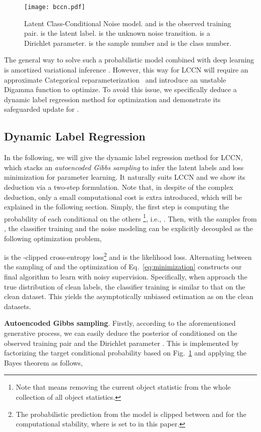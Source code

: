 \documentclass[journal]{IEEEtran}
\begin{document}
\begin{figure} 
\centering
\texttt{[image: bccn.pdf]}
\caption{Latent Class-Conditional Noise model.  and  is the observed training pair.  is the latent label.  is the unknown noise transition.  is a Dirichlet parameter.  is the sample number and  is the class number.}\label{fig:bccn}
\end{figure}
The general way to solve such a probabilistic model combined with deep learning is amortized variational inference \cite{kingma2013auto,MnihNVI}. However, this way for LCCN will require an approximate Categorical reparameterization~\cite{jang2017categorical,maddison2016concrete} and introduce an unstable Digamma function to optimize. To avoid this issue, we specifically deduce a dynamic label regression method for optimization and demonstrate its safeguarded update for .

\subsection{Dynamic Label Regression}
In the following, we will give the dynamic label regression method for LCCN, which stacks an \emph{autoencoded Gibbs sampling} to infer the latent labels and loss minimization for parameter learning. It naturally suits LCCN and we show its deduction via a two-step formulation. Note that, in despite of the complex deduction, only a small computational cost is extra introduced, which will be explained in the following section. Simply, the first step is computing the probability of each  conditional on the others \footnote{Note that  means removing the current object statistic from the whole collection of all object statistics.}, i.e., .
Then, with the samples from , the classifier training and the noise modeling can be explicitly decoupled as the following optimization problem,

 is the -clipped cross-entropy loss\footnote{The probabilistic prediction from the model is clipped between  and  for the computational stability, where  is set to  in this paper.} and  is the likelihood loss. Alternating between the sampling of  and the optimization of Eq.~\eqref{eq:minimization} constructs our final algorithm to learn with noisy supervision. Specifically, when  approach the true distribution of clean labels, the classifier training is similar to that on the clean dataset. This yields the asymptotically unbiased estimation as on the clean datasets.

\textbf{Autoencoded Gibbs sampling}. Firstly, according to the aforementioned generative process, we can easily deduce the posterior of  conditioned on the observed training pair  and the Dirichlet parameter . This is implemented by factorizing the target conditional probability based on Fig.~\ref{fig:bccn} and applying the Bayes theorem as follows,
\end{document}
